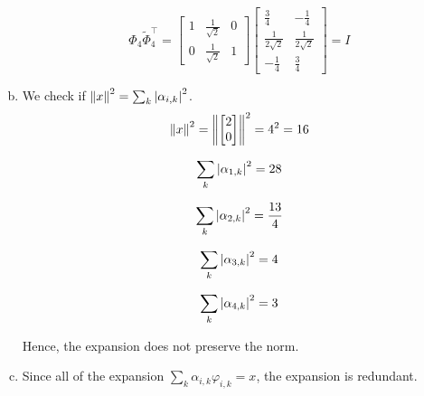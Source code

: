 \begin{enumerate}[(a)]
\[\Phi_4 \tilde{\Phi}_4^\top = \begin{bmatrix}1 & \frac{1}{\sqrt{2}} & 0 \\ 0 & \frac{1}{\sqrt{2}} & 1\end{bmatrix} \begin{bmatrix} \frac{3}{4} & -\frac{1}{4} \\ \frac{1}{2\sqrt{2}} & \frac{1}{2\sqrt{2}} \\ -\frac{1}{4} & \frac{3}{4} \end{bmatrix} = I\]

\item We check if $\left\lVert x \right\rVert^2 = \sum_k\left\lvert \alpha_{i,k} \right\rvert^2$.
\[\left\lVert x \right\rVert^2 = \left\lVert \begin{bmatrix} 2\\0 \end{bmatrix} \right\rVert^2 = 4^2 = 16\]

\[\sum_k\left\lvert \alpha_{1,k} \right\rvert^2 = 28\]

\[\sum_k\left\lvert \alpha_{2,k} \right\rvert^2 = \frac{13}{4}\]

\[\sum_k\left\lvert \alpha_{3,k} \right\rvert^2 = 4\]

\[\sum_k\left\lvert \alpha_{4,k} \right\rvert^2 = 3\]

Hence, the expansion does not preserve the norm.

\item Since all of the expansion $\sum_k \alpha_{i,k} \varphi_{i,k} = x$, the expansion is redundant.
\end{enumerate}